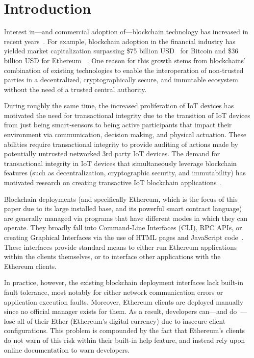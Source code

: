 \section{Introduction}

Interest in---and commercial adoption of---blockchain technology has increased in recent years~\cite{TheTruthAdoption:online}. For example, blockchain adoption in the financial industry has yielded market capitalization surpassing \$75 billion USD~\cite{BitcoinPrices:online} for Bitcoin and \$36 billion USD for Ethereum ~\cite{EthereumPrices:online}.  One reason for this growth stems from blockchains' combination of existing technologies to enable  the interoperation of non-trusted parties in a decentralized, cryptographically secure, and immutable ecosystem without the need of a trusted central authority.

During roughly the same time, the increased proliferation of IoT devices has motivated the need for transactional integrity due to the transition of IoT devices from just being smart-sensors to being active participants that impact their environment via communication, decision making, and physical actuation. These abilities require transactional integrity to provide auditing of actions made by potentially untrusted networked 3rd party IoT devices. The demand for transactional integrity in IoT devices that simultaneously leverage  blockchain features (such as decentralization, cryptographic security, and immutability) has motivated research on creating transactive IoT blockchain applications~\cite{Bogner2016,Buccafurri2017}.

Blockchain deployments (and specifically Ethereum, which is the focus of this paper due to its large installed base, and its powerful smart contract language) are generally managed via programs that have different modes in which they can operate. They broadly fall into Command-Line Interfaces (CLI), RPC APIs, or creating Graphical Interfaces via the use of HTML pages and JavaScript code~\cite{EthereumAPInterfaces:online}. These interfaces provide standard means to either run Ethereum applications within the clients themselves, or to interface other applications with the Ethereum clients. 

In practice, however, the existing blockchain deployment interfaces lack built-in fault tolerance, most notably for either network communication errors or application execution faults. Moreover, Ethereum clients are deployed manually since no official manager exists for them. As a result, developers can---and do~\cite{ethereumLostCoinAPI:online}---lose all of their Ether (Ethereum's digital currency) due to insecure client configurations. This problem is compounded by the fact that Ethereum's clients do not warn of this risk within their built-in help feature, and instead rely upon online documentation to warn developers. 

